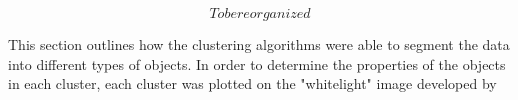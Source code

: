 
\[ To be reorganized \]

This section outlines how the clustering algorithms were able to segment the data into different types of objects.
In order to determine the properties of the objects in each cluster, each cluster was plotted on the "whitelight" image developed by \citet{chandar10}



